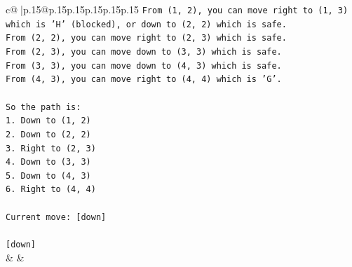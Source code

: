 \documentclass{article}
\begin{document}
{\begin{supertabular}{c@{$\;$}|p{.15\linewidth}@{}p{.15\linewidth}p{.15\linewidth}p{.15\linewidth}p{.15\linewidth}p{.15\linewidth}}
{{{\texttt{From (1, 2), you can move right to (1, 3) which is 'H' (blocked), or down to (2, 2) which is safe.} \\
\texttt{From (2, 2), you can move right to (2, 3) which is safe.} \\
\texttt{From (2, 3), you can move down to (3, 3) which is safe.} \\
\texttt{From (3, 3), you can move down to (4, 3) which is safe.} \\
\texttt{From (4, 3), you can move right to (4, 4) which is 'G'.} \\
\\ 
\texttt{So the path is:} \\
\texttt{1. Down to (1, 2)} \\
\texttt{2. Down to (2, 2)} \\
\texttt{3. Right to (2, 3)} \\
\texttt{4. Down to (3, 3)} \\
\texttt{5. Down to (4, 3)} \\
\texttt{6. Right to (4, 4)} \\
\\ 
\texttt{Current move: {[}down{]}} \\
\\ 
\texttt{{[}down{]}} \\
            }
        }
    }
    & & \\ \\


\end{supertabular}}
\end{document}
